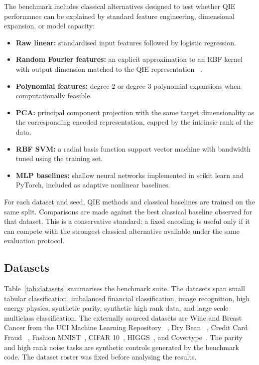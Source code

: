 \documentclass[12pt]{article}
\begin{document}
The benchmark includes classical alternatives designed to test whether QIE
performance can be explained by standard feature engineering, dimensional
expansion, or model capacity:
\begin{itemize}
  \item \textbf{Raw linear:} standardised input features followed by logistic
        regression.
  \item \textbf{Random Fourier features:} an explicit approximation to an RBF
        kernel with output dimension matched to the QIE representation
        ~\citep{rahimi2007}.
  \item \textbf{Polynomial features:} degree 2 or degree 3 polynomial
        expansions when computationally feasible.
  \item \textbf{PCA:} principal component projection with the same target
        dimensionality as the corresponding encoded representation, capped by
        the intrinsic rank of the data.
  \item \textbf{RBF SVM:} a radial basis function support vector machine with
        bandwidth tuned using the training set.
  \item \textbf{MLP baselines:} shallow neural networks implemented in
        scikit learn and PyTorch, included as adaptive nonlinear baselines.
\end{itemize}

For each dataset and seed, QIE methods and classical baselines are trained on
the same split. Comparisons are made against the best classical baseline
observed for that dataset. This is a conservative standard: a fixed encoding is
useful only if it can compete with the strongest classical alternative available
under the same evaluation protocol.

\subsection{Datasets}
\label{sec:datasets}

Table~\ref{tab:datasets} summarises the benchmark suite. The datasets span
small tabular classification, imbalanced financial classification, image
recognition, high energy physics, synthetic parity, synthetic high rank data,
and large scale multiclass classification. The externally sourced datasets are
Wine and Breast Cancer from the UCI Machine Learning Repository
~\citep{aeberhard1991wine,wolberg1995breast}, Dry Bean
~\citep{koklu2020drybean}, Credit Card Fraud
~\citep{dalpozzolo2015calibrating}, Fashion MNIST~\citep{xiao2017fashion},
CIFAR 10~\citep{krizhevsky2009cifar}, HIGGS~\citep{baldi2014higgs}, and
Covertype~\citep{blackard1998covertype}. The parity and high rank noise tasks
are synthetic controls generated by the benchmark code. The dataset roster was
fixed before analysing the results.
\end{document}
